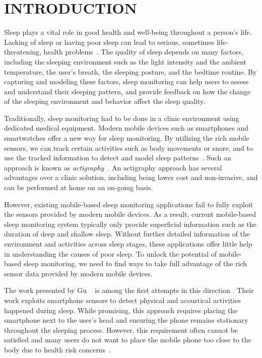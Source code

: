 \section{INTRODUCTION}\label{sec:1introduction}

Sleep plays a vital role in good health and well-being throughout a person's life. Lacking of sleep or having poor sleep can lead to
serious, sometimes life-threatening, health problems~\cite{lallukka2016contribution}. The quality of sleep depends on many factors,
including the sleeping environment such as the light intensity and the ambient temperature, the user's breath, the sleeping posture, and
the bedtime routine. By capturing and modeling these factors, sleep monitoring can help users to assess and understand their sleeping
pattern, and provide feedback on how the change of the sleeping environment and behavior affect the sleep quality.

Traditionally, sleep monitoring had to be done in a clinic environment using dedicated medical equipment.  Modern mobile devices such as
smartphones and smartwatches offer a new way for sleep monitoring. By utilizing the rich mobile sensors, we can track certain activities
such as body movements or snore, and to use the tracked information to detect and model sleep
patterns~\cite{zeo,Jawbone,SleepAndroid,fitbit,gu2016sleep}. Such an approach is known as
\emph{actigraphy}~\cite{Actigraphy,ancoli2003role}. An actigraphy approach has several advantages over a clinic solution, including being
lower cost and non-invasive, and can be performed at home on an on-going basis.


However, existing mobile-based sleep monitoring applications fail to fully exploit the sensors provided by modern mobile devices. As a
result, current mobile-based sleep monitoring system typically only provide superficial information such as the duration of deep and
shallow sleep. Without further detailed information of the environment and activities across sleep stages, these applications offer little
help in understanding the causes of poor sleep. To unlock the potential of mobile-based sleep monitoring, we need to find ways to take full
advantage of the rich sensor data provided by modern mobile devices.


The work presented by Gu \etal~\cite{gu2016sleep} is among the first attempts in this direction
\cite{lawson2013validating,bauer2012shuteye,min2014toss,al2014classifying}. Their work exploits smartphone sensors to detect physical and
acoustical activities happened during sleep. While promising, this approach requires placing the smartphone next to the user's head and
ensuring the phone remains stationary throughout the sleeping process. However, this requirement often cannot be satisfied and many users
do not want to place the mobile phone too close to the body due to health risk concerns~\cite{StepHealth,Quorasleep}.

